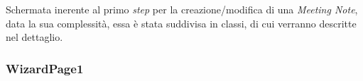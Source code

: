 

Schermata inerente al primo \emph{step} per la creazione/modifica di una \emph{Meeting Note}, data la sua complessità, essa è stata suddivisa in classi, di cui verranno descritte nel dettaglio. 

\subsubsection*{WizardPage1}
\label{subsubsec:wizard-page-1}


